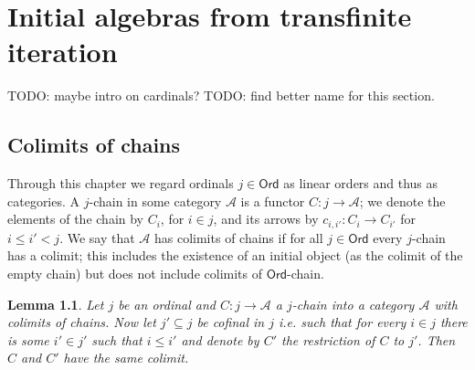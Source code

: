 \documentclass[letterpaper, 11pt, oneside]{memoir}
\theoremstyle{myteo}
\newtheorem{lemma}[theorem]{Lemma}
\numberwithin{equation}{section}
\newcommand{\marginnote}[1]{\marginpar{\footnotesize #1}}
\newcommand{\Ord}{\textsf{Ord}}
\newcommand{\A}{\mathscr{A}}
\begin{document}
\chapter{Initial algebras from transfinite iteration}
\newpage

\begin{tcolorbox}
  TODO: maybe intro on cardinals?
  TODO: find better name for this section.
\end{tcolorbox}

\section{Colimits of chains}

Through this chapter we regard ordinals \(j \in \Ord\) as linear orders and thus as categories.
A \(j\)-chain in some category \(\A\) is a functor \(C : j \to \A \)\marginnote{\(j\)-chain}; we denote the elements of the chain by \(C_i\), for \(i \in j\), and its arrows by \(c_{i,i'} : C_i \to C_{i'}\) for \(i \leq i' < j\).
We say that \(\A\) has colimits of chains if for all \(j \in \Ord\) every \(j\)-chain has a colimit; this includes the existence of an initial object (as the colimit of the empty chain) but does not include colimits of \(\Ord\)-chain.

\begin{lemma}
  \label{lemma:final_functors}
  Let \(j\) be an ordinal and \(C : j \to \A\) a \(j\)-chain into a category \(\A\) with colimits of chains.
  Now let \(j' \subseteq j\) be cofinal in \(j\) i.e. such that for every \(i \in j\) there is some \(i' \in j'\) such that \(i \leq i'\) and denote by \(C'\) the restriction of \(C\) to \(j'\).
  Then \(C\) and \(C'\) have the same colimit.
\end{lemma}
\end{document}
